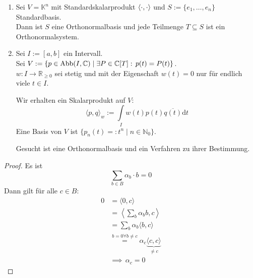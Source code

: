 \documentclass[parskip,a4paper,twoside,DIV15,BCOR12mm]{scrbook}
\begin{document}
\begin{example}
\begin{enumerate}
\item Sei \(V=\mathbb{K}^{n}\) mit Standardskalarprodukt \(\operatorname{\langle\cdot,\cdot\rangle}\) und 
\(S:=\{e_{1},\ldots,e_{n}\}\) Standardbasis.\\
Dann ist \(S\) eine Orthonormalbasis und jede Teilmenge \(T\subseteq S\) ist
ein Orthonormalsystem.
\item Sei \(I:=[a,b]\) ein Intervall.\\
Sei 
\(V:=\{p\in\operatorname{Abb}(I,\mathbb{C})\mid\exists P\in\mathbb{C}[T]:\,p(t)=P(t)\}\).\\
\(w:I\to\mathbb{R}_{\geq0}\) sei stetig und mit der Eigenschaft \(w(t)=0\) nur
für endlich viele \(t\in I\).

Wir erhalten ein Skalarprodukt auf \(V\):
\[
\langle p,q\rangle_{w}:=\int\limits_{I}{w(t)p(t)\overline{q(t)}\mathrm{d}t}
\]
Eine Basis von \(V\) ist \(\{p_{n}(t)=:t^{n}\mid n\in\mathbb{N}_{0}\}\).

Gesucht ist eine Orthonormalbasis und ein Verfahren zu ihrer Bestimmung.
\end{enumerate}
\end{example}
\begin{comment}
Jedes Orthogonalsystem \(B\) mit \(0\not\in B\) ist linear unabhängig.
\end{comment}
\begin{proof}
Es ist
\[
\sum_{b\in B}{\alpha_{b}\cdot b}=0
\]
Dann gilt für alle \(c\in B\):
\begin{align*}
0&=\langle 0,c\rangle\\
&=\left\langle\sum_{b}{\alpha_{b}b},c\right\rangle\\
&=\sum_{b}{\alpha_{b}\langle b,c\rangle}\\
&\overset{b=0\forall b\neq c}{=}\alpha_{c}\underbrace{\langle c,c\rangle}_{\neq c}\\
&\implies\,\alpha_{c}=0
\end{align*}
\end{proof}
\end{document}
